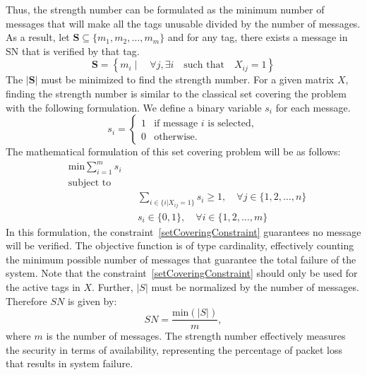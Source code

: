 Thus, the strength number can be formulated as the minimum number of messages that will make all the tags unusable divided by the number of messages. As a result, let \( \textbf{S} \subseteq \{m_1, m_2, \ldots, m_m\} \) and for any tag, there exists a message in SN that is verified by that tag. 
\begin{equation}
	\textbf{S} = \left\{m_i \mid \quad \forall j, \exists i \quad \text{such that} \quad X_{ij}=1 \right\} 
\end{equation}
The $|\textbf{S}|$ must be minimized to find the strength number. 
For a given matrix $X$, finding the strength number is similar to the classical set covering the problem with the following formulation. We define a binary variable \( s_i \) for each message.
\begin{equation}
	s_i =
	\begin{cases} 
		1 & \text{if message $i$ is selected} , \\
		0 & \text{otherwise}.
	\end{cases}
\end{equation}
The mathematical formulation of this set covering problem will be as follows:
\begin{align}
	& \text{min} \sum_{i=1}^{m} s_i  &&  \\
	& \text{subject to}&& \nonumber\\
	& && \sum_{i \in \{i| X_{ij}=1\}} s_i \geq 1, \quad \forall j \in \{1, 2, \ldots, n\} \label{setCoveringConstraint} \\
	& && s_i \in \{0, 1\}, \quad \forall i \in \{1, 2, \ldots, m\}
\end{align}
In this formulation, the constraint~\eqref{setCoveringConstraint} guarantees no message will be verified. The objective function is of type cardinality, effectively counting the minimum possible number of messages that guarantee the total failure of the system. Note that the constraint~\eqref{setCoveringConstraint} should only be used for the active tags in $X$.  Further, $|S|$ must be normalized by the number of messages. Therefore $SN$ is given by:
\begin{equation}
	SN = \dfrac{\text{min}(|S|)}{m},
\end{equation}
where $m$ is the number of messages. The strength number effectively measures the security in terms of availability, representing the percentage of packet loss that results in system failure.
